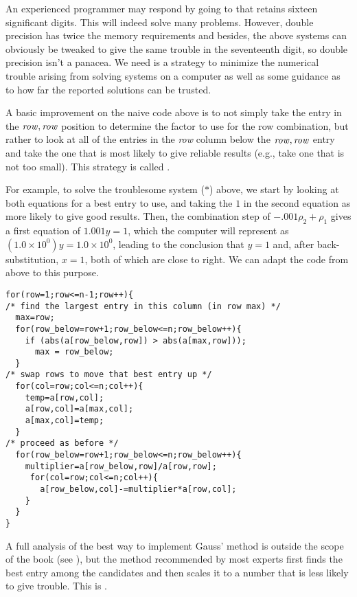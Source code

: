 An experienced programmer may respond by going to
that retains sixteen significant digits.
This will indeed solve many problems.
However, double precision has twice
the memory requirements
and besides, the above systems can obviously be tweaked to give the
same trouble in the seventeenth digit, so double precision
isn't a panacea.
We need is a strategy to minimize the numerical
trouble arising from solving systems on a computer
as well as some guidance as to how far the reported 
solutions can be trusted. 

A basic improvement on the naive code above 
is to not simply take the entry
in the $\text{\textit{row}},\text{\textit{row}}$
position to determine the factor to use for the row combination,
but rather to look at all of the entries in the \textit{row}
column below the $\text{\textit{row}},\text{\textit{row}}$ entry
and take the one that is most likely to give reliable results
(e.g., take one that is not too small).
This strategy is called .%

For example, to solve the troublesome system ($*$) above,
we start by looking at both equations for a best entry to use, 
and taking the $1$ in
the second equation as more likely to give good results.
Then, the combination step of $-.001\rho_2+\rho_1$ gives a first equation of 
$1.001y=1$, which the computer will represent as 
$(1.0\times 10^{0})y=1.0\times 10^{0}$, leading to the conclusion that 
$y=1$ and, after back-substitution, $x=1$, 
both of which are close to right.  
We can adapt the code from above to this purpose.
\begin{lstlisting}
for(row=1;row<=n-1;row++){
/* find the largest entry in this column (in row max) */
  max=row;
  for(row_below=row+1;row_below<=n;row_below++){
    if (abs(a[row_below,row]) > abs(a[max,row]));
      max = row_below;
  }
/* swap rows to move that best entry up */
  for(col=row;col<=n;col++){
    temp=a[row,col];
    a[row,col]=a[max,col];
    a[max,col]=temp;
  }
/* proceed as before */
  for(row_below=row+1;row_below<=n;row_below++){
    multiplier=a[row_below,row]/a[row,row];
     for(col=row;col<=n;col++){
       a[row_below,col]-=multiplier*a[row,col];
    }
  }
}
\end{lstlisting}

A full analysis of the best way to implement Gauss' method 
is outside the scope of the book (see \cite{Wilkinson65}),
but the method recommended by most experts 
first finds the best entry
among the candidates and then scales it to a number that is less
likely to give trouble.
This is 
.

